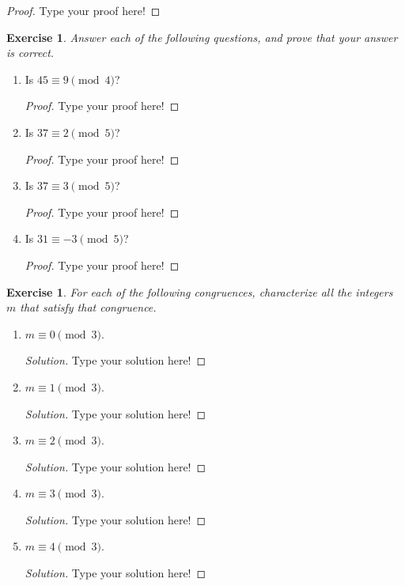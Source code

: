 \documentclass[12pt,leqno]{article}
\numberwithin{equation}{section}
\newtheorem{exer}[thm]{Exercise}
\theoremstyle{definition}
\begin{document}
\begin{proof}[Proof]
Type your proof here!
\end{proof}

\begin{exer} Answer each of the following questions, and prove that your answer is
correct. \end{exer}
\begin{enumerate}
\item[(1)] Is $45 \equiv 9\pmod{4}$?
\begin{proof}[Proof]
Type your proof here!
\end{proof}

\item[(2)] Is $37 \equiv 2 \pmod{5}$?
\begin{proof}[Proof]
Type your proof here!
\end{proof}

\item[(3)] Is ${37 \equiv 3 \pmod{5}}$?
\begin{proof}[Proof]
Type your proof here!
\end{proof}

\item[(4)] Is $31 \equiv -3 \pmod{5}$?
\begin{proof}[Proof]
Type your proof here!
\end{proof}

\end{enumerate}


\begin{exer}  For each of the following congruences,
characterize all the integers $m$ that satisfy that congruence.
\end{exer}
\begin{enumerate}
    \item[(1)] $m \equiv 0 \pmod{3}$.
    \begin{proof}[Solution]
    Type your solution here!
    \end{proof}

    \item[(2)] $m \equiv 1 \pmod{3}$.
    \begin{proof}[Solution]
    Type your solution here!
    \end{proof}

    \item[(3)] $m \equiv 2 \pmod{3}$.
    \begin{proof}[Solution]
    Type your solution here!
    \end{proof}

    \item[(4)] $m \equiv 3 \pmod{3}$.
    \begin{proof}[Solution]
    Type your solution here!
    \end{proof}

    \item[(5)] $m \equiv 4 \pmod{3}$.
    \begin{proof}[Solution]
    Type your solution here!
    \end{proof}

\end{enumerate}
\end{document}
